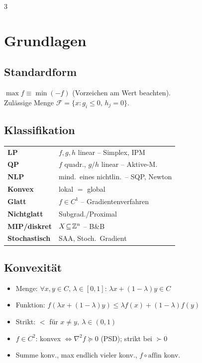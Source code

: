 \documentclass[8pt,a4paper]{extarticle}
\begin{document}

\begin{multicols*}{3}

\section{Grundlagen}
\subsection{Standardform}
$\max f \equiv \min(-f)$ (Vorzeichen am Wert beachten).\\
Zul\"assige Menge $\mathcal{F}=\{x:g_i\le 0,\,h_j=0\}$.

\subsection{Klassifikation}
\begin{tabularx}{\linewidth}{@{}l@{\ }X@{}}
\textbf{LP} & $f,g,h$ linear -- Simplex, IPM \\
\textbf{QP} & $f$ quadr., $g/h$ linear -- Aktive-M. \\
\textbf{NLP} & mind.\ eines nichtlin.\ -- SQP, Newton \\
\textbf{Konvex} & lokal $=$ global \\
\textbf{Glatt} & $f\!\in\!C^1$ -- Gradientenverfahren \\
\textbf{Nichtglatt} & Subgrad./Proximal \\
\textbf{MIP/diskret} & $X\!\subseteq\!\mathbb{Z}^n$ -- B\&B \\
\textbf{Stochastisch} & SAA, Stoch.\ Gradient \\
\end{tabularx}

\subsection{Konvexit\"at}
\begin{itemize}
\item Menge: $\forall x,y\!\in\!C,\,\lambda\!\in\![0,1]\!:\,\lambda x{+}(1{-}\lambda)y\!\in\!C$
\item Funktion: $f(\lambda x{+}(1{-}\lambda)y)\le \lambda f(x){+}(1{-}\lambda)f(y)$
\item Strikt: $<$ f\"ur $x\ne y,\ \lambda\!\in\!(0,1)$
\item $f\in C^2$: konvex $\Leftrightarrow \nabla^2 f\succeq 0$ (PSD); strikt bei $\succ 0$
\item Summe konv., max endlich vieler konv., $f\!\circ\!\text{affin}$ konv.
\end{itemize}


\end{multicols*}
\end{document}
